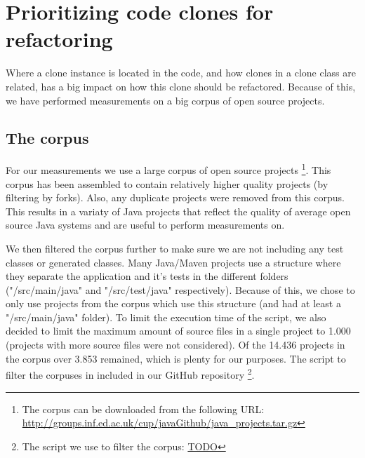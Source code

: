 \chapter{Prioritizing code clones for refactoring}
\label{ch:research_method}
Where a clone instance is located in the code, and how clones in a clone class are related, has a big impact on how this clone should be refactored. Because of this, we have performed measurements on a big corpus of open source projects.

\section{The corpus}
For our measurements we use a large corpus of open source projects \cite{githubCorpus2013}\footnote{The corpus can be downloaded from the following URL: \url{http://groups.inf.ed.ac.uk/cup/javaGithub/java_projects.tar.gz}}. This corpus has been assembled to contain relatively higher quality projects (by filtering by forks). Also, any duplicate projects were removed from this corpus. This results in a variaty of Java projects that reflect the quality of average open source Java systems and are useful to perform measurements on.

We then filtered the corpus further to make sure we are not including any test classes or generated classes. Many Java/Maven projects use a structure where they separate the application and it's tests in the different folders ("/src/main/java" and "/src/test/java" respectively). Because of this, we chose to only use projects from the corpus which use this structure (and had at least a "/src/main/java" folder). To limit the execution time of the script, we also decided to limit the maximum amount of source files in a single project to 1.000 (projects with more source files were not considered). Of the 14.436 projects in the corpus over 3.853 remained, which is plenty for our purposes. The script to filter the corpuses in included in our GitHub repository \footnote{The script we use to filter the corpus: \url{TODO}}.
